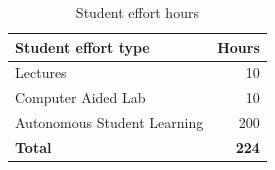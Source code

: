 \documentclass[abstract=on,parskip=full,headings=standardclasses,fontsize=11pt,paper=a4]{scrartcl}
\begin{document}

\begin{table}[h] \centering \onehalfspacing
\caption*{Student effort hours}
\begin{tabular}{ l r} 
\toprule
Student effort type &  Hours \\
\midrule
Lectures & 10 \\
Computer Aided Lab  & 10 \\
Autonomous Student Learning  & 200 \\
\textbf{Total} & \textbf{224} \\
\bottomrule
\end{tabular}
\end{table}
\end{document}
